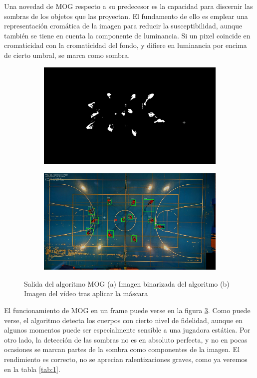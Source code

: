 Una novedad de MOG respecto a su predecesor es la capacidad para discernir las sombras de los objetos que las proyectan. El fundamento de ello es emplear una representación cromática de la imagen para reducir la susceptibilidad, aunque también se tiene en cuenta la componente de luminancia. Si un pixel coincide en cromaticidad con la cromaticidad del fondo, y difiere en luminancia por encima de cierto umbral, se marca como sombra.

\begin{figure}
\begin{subfigure}{.5\textwidth}
  \centering
  \includegraphics[width=.9\linewidth]{images/MOGsub}
  \caption { }
  \label{fig:MOG1a}
\end{subfigure}%
\begin{subfigure}{.5\textwidth}
  \centering
  \includegraphics[width=.9\linewidth]{images/MOG}
  \caption { }
  \label{fig:MOG1b}
\end{subfigure}
\caption{Salida del algoritmo MOG (a) Imagen binarizada del algoritmo (b) Imagen del vídeo tras aplicar la máscara}
\label{fig:MOG}
\end{figure}

El funcionamiento de MOG en un frame puede verse en la figura \ref{fig:MOG}. Como puede verse, el algoritmo detecta los cuerpos con cierto nivel de fidelidad, aunque en algunos momentos puede ser especialmente sensible a una jugadora estática. Por otro lado, la detección de las sombras no es en absoluto perfecta, y no en pocas ocasiones se marcan partes de la sombra como componentes de la imagen. El rendimiento es correcto, no se aprecian ralentizaciones graves, como ya veremos en la tabla \ref{tab:1}.


